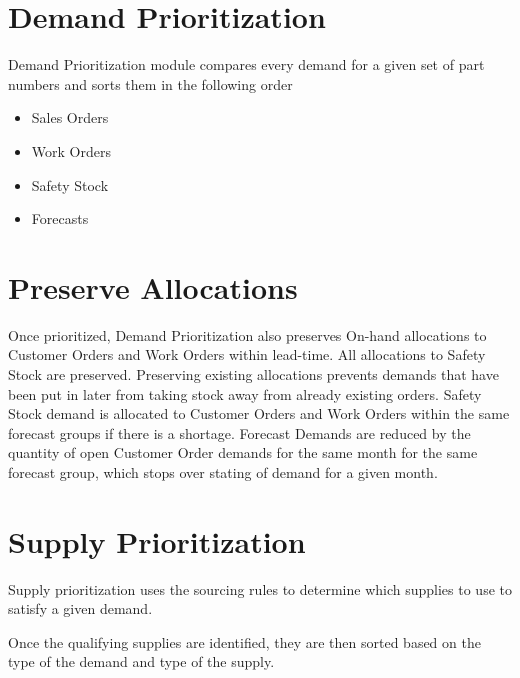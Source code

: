 \documentclass[letterpaper,10pt,english]{sphinxmanual}
\begin{document}
\section{Demand Prioritization}
\label{\detokenize{index:demand-prioritization}}
Demand Prioritization module compares every demand for a given set of
part numbers and sorts them in the following order
\begin{itemize}
\item {} 
Sales Orders

\item {} 
Work Orders

\item {} 
Safety Stock

\item {} 
Forecasts

\end{itemize}


\section{Preserve Allocations}
\label{\detokenize{index:preserve-allocations}}
Once prioritized, Demand Prioritization also preserves On-hand allocations to
Customer Orders and Work Orders within lead-time. All allocations to
Safety Stock are preserved. Preserving existing allocations prevents
demands that have been put in later from taking stock away from already
existing orders. Safety Stock demand is allocated to Customer Orders and
Work Orders within the same forecast groups if there is a shortage.
Forecast Demands are reduced by the quantity of open Customer Order
demands for the same month for the same forecast group, which stops over
stating of demand for a given month.


\section{Supply Prioritization}
\label{\detokenize{index:supply-prioritization}}
Supply prioritization uses the sourcing rules to determine which
supplies to use to satisfy a given demand.

Once the qualifying supplies are identified, they are then sorted based on the type of the demand and
type of the supply.
\end{document}
